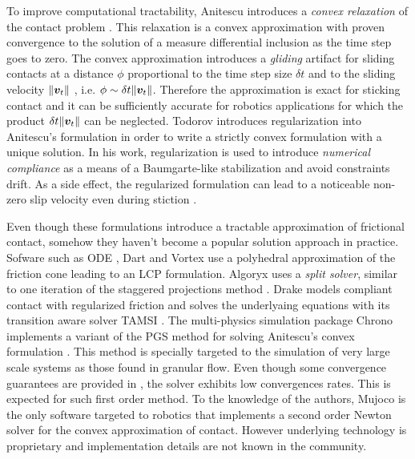 
To improve computational tractability, Anitescu introduces a \textit{convex
relaxation} of the contact problem \cite{bib:anitescu2006}. This relaxation is a
convex approximation with proven convergence to the solution of a measure
differential inclusion as the time step goes to zero. The convex approximation
introduces a \emph{gliding} artifact for sliding contacts at a distance $\phi$
proportional to the time step size $\delta t$ and to the sliding velocity
$\Vert{\bm{v}}_t\Vert$ \cite{bib:mazhar2014}, i.e. $\phi\sim \delta
t\Vert{\bm{v}}_t\Vert$. Therefore the approximation is exact for sticking contact
and it can be sufficiently accurate for robotics applications for which the
product $\delta t\Vert{\bm{v}}_t\Vert$ can be neglected. Todorov
\cite{bib:todorov2014} introduces regularization into Anitescu's formulation in
order to write a strictly convex formulation with a unique solution. In his
work, regularization is used to introduce \emph{numerical compliance} as a means
of a Baumgarte-like stabilization and avoid constraints drift. As a side effect, the regularized formulation can lead to a noticeable non-zero slip velocity even during stiction \cite{bib:simbenchmark}.

Even though these formulations introduce a tractable approximation of frictional
contact, somehow they haven't become a popular solution approach in practice.
Sofware such as ODE \cite{bib:ode}, Dart \cite{bib:dart} and Vortex
\cite{bib:vortex} use a polyhedral approximation of the friction cone leading to
an LCP formulation. Algoryx \cite{bib:algoryx} uses a \emph{split solver},
similar to one iteration of the staggered projections method
\cite{bib:Kaufman2008}. Drake \cite{bib:drake} models compliant contact with
regularized friction and solves the underlyaing equations with its transition
aware solver TAMSI \cite{bib:castro2020}. The multi-physics simulation package
Chrono \cite{bib:hrono2016} implements a variant of the PGS method for solving
Anitescu's convex formulation \cite{bib:tasora2011}. This method is specially
targeted to the simulation of very large scale systems as those found in
granular flow. Even though some convergence guarantees are provided in
\cite{bib:anitescu2010}, the solver exhibits low convergences rates. This is
expected for such first order method. To the knowledge of the authors, Mujoco
\cite{bib:mujoco} is the only software targeted to robotics that implements a
second order Newton solver for the convex approximation of contact. However
underlying technology is proprietary and implementation details are not known in
the community.

